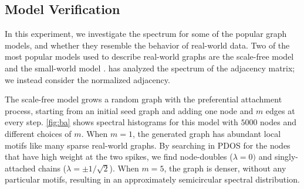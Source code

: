 \subsection{Model Verification}

In this experiment, we investigate the spectrum for some of the popular graph
models, and whether they resemble the behavior of real-world data. Two of the
most popular models used to describe real-world graphs are the scale-free model 
\cite{barabasi1999emergence} and the small-world model 
\cite{watts1998collective}. \citet{farkas2001spectra} has analyzed
the spectrum of the adjacency matrix; we instead consider the normalized
adjacency.

The scale-free model grows a random graph with the preferential attachment
process, starting from an initial seed graph and adding one node and $m$ edges
at every step. \cref{fig:ba} shows spectral histograms for this model with
$5000$ nodes and different choices of $m$. When $m=1$, the generated graph has
abundant local motifs like many sparse real-world graphs. By searching in PDOS
for the nodes that have high weight at the two spikes, we find node-doubles 
($\lambda=0)$ and singly-attached chains ($\lambda=\pm 1/\sqrt{2}$). When $m=5$,
the graph is denser, without any particular motifs, resulting in an
approximately semicircular spectral distribution.

